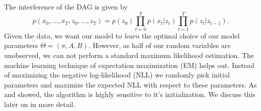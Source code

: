 \documentclass{article}
\begin{document}
The interference of the DAG is given by
\begin{equation}
p(x_0,\dots,x_T,z_0,\dots,z_T) =
p(z_0) \prod_{t=0}^T p(x_t|z_{t}) \prod_{t=1}^T p(z_t|z_{t-1}).
\end{equation}
Given the data, we want our model to \emph{learn} the optimal choice of our model parameters $\Theta = (\pi,A,B)$. However, as half of our random variables are unobserved, we can not perform a standard maximum likelihood estimation. The machine learning technique of expectation maximization (EM) helps out. Instead of maximizing the negative log-likelihood (NLL) we randomly pick initial parameters and maximize the expected NLL with respect to these parameters. As \cite{in1}
and \cite{in2} showed, the algorithm is highly sensitive to it's initialization. We discuss this later on in more detail. 
\end{document}
